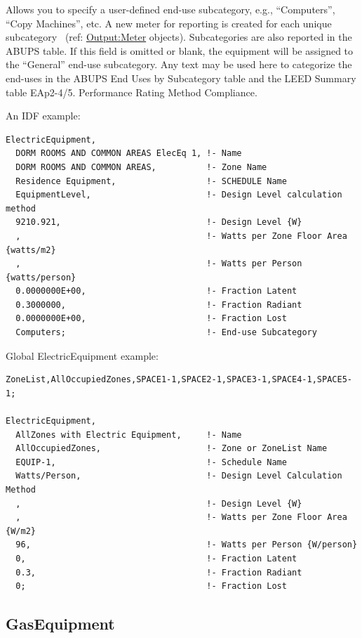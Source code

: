 Allows you to specify a user-defined end-use subcategory, e.g., ``Computers'', ``Copy Machines'', etc. A new meter for reporting is created for each unique subcategory~ (ref: \hyperref[outputmeter-and-outputmetermeterfileonly]{Output:Meter} objects). Subcategories are also reported in the ABUPS table. If this field is omitted or blank, the equipment will be assigned to the ``General'' end-use subcategory. Any text may be used here to categorize the end-uses in the ABUPS End Uses by Subcategory table and the LEED Summary table EAp2-4/5. Performance Rating Method Compliance.


An IDF example:

\begin{lstlisting}
ElectricEquipment,
  DORM ROOMS AND COMMON AREAS ElecEq 1, !- Name
  DORM ROOMS AND COMMON AREAS,          !- Zone Name
  Residence Equipment,                  !- SCHEDULE Name
  EquipmentLevel,                       !- Design Level calculation method
  9210.921,                             !- Design Level {W}
  ,                                     !- Watts per Zone Floor Area {watts/m2}
  ,                                     !- Watts per Person {watts/person}
  0.0000000E+00,                        !- Fraction Latent
  0.3000000,                            !- Fraction Radiant
  0.0000000E+00,                        !- Fraction Lost
  Computers;                            !- End-use Subcategory
\end{lstlisting}

Global ElectricEquipment example:

\begin{lstlisting}
ZoneList,AllOccupiedZones,SPACE1-1,SPACE2-1,SPACE3-1,SPACE4-1,SPACE5-1;

ElectricEquipment,
  AllZones with Electric Equipment,     !- Name
  AllOccupiedZones,                     !- Zone or ZoneList Name
  EQUIP-1,                              !- Schedule Name
  Watts/Person,                         !- Design Level Calculation Method
  ,                                     !- Design Level {W}
  ,                                     !- Watts per Zone Floor Area {W/m2}
  96,                                   !- Watts per Person {W/person}
  0,                                    !- Fraction Latent
  0.3,                                  !- Fraction Radiant
  0;                                    !- Fraction Lost
\end{lstlisting}

\subsection{GasEquipment}\label{gasequipment}

